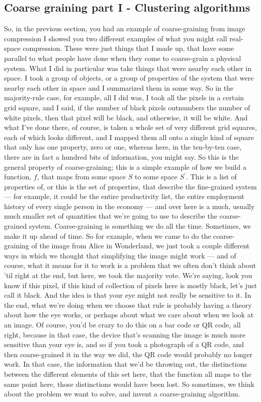 \documentclass[]{article}
\begin{document}
\subsection{Coarse graining part I - Clustering algorithms}

So, in the previous section,
you had an example of coarse-graining
from image compression
I showed you two different examples
of what you might call
real-space compression.
These were just things that
I made up,
that have some parallel
to what people have done
when they come to coarse-grain
a physical system.
What I did in particular
was take things
that were nearby each other in space.
I took a group
of objects, or a group of properties
of the system
that were nearby each other in space 
and I summarized them in some way.
So in the majority-rule case, for example,
all I did was, I took all the pixels
in a certain grid square, and I said, 
if the number of black pixels
outnumbers the number of white pixels,
then that pixel will be black,
and otherwise, it will be white.
And what I've done there, of course,
is taken a whole set of very different
grid squares, each of which
looks different,
and I mapped them all onto a single
kind of square
that only has one property, zero or one,
whereas here, in the ten-by-ten case,
there are in fact a hundred bits
of information, you might say.
So this is the general property
of coarse-graining; this is
a simple example of how we build
a function, $f$, that maps from some space $S$
to some space $S^\prime$.
This is a list of properties of, 
or this is the set of properties,
that describe the fine-grained system ---
for example, it could be the entire
productivity list,
the entire employment history
of every single person in the economy ---
and over here is a much,
usually much smaller set of quantities
that we're going to use to describe
the coarse-grained system.
Coarse-graining is something we do
all the time.
Sometimes, we make it up ahead of time.
So for example,
when we came to do the coarse-graining
of the image from Alice in Wonderland,
we just took a couple different ways
in which we thought
that simplifying the image
might work --- and of course,
what it means for it to work
is a problem that we often
don't think about 'til
right at the end, but here,
we took the majority vote.
We're saying,  look you know
if this pixel, if this kind of collection
of pixels here is mostly black,
let's just call it black.
And the idea is that your eye
might not really be
sensitive to it. In the end,
what we're doing when we choose
that rule is probably having a theory
about how the eye works,
or perhaps about what we care about
when we look at an image.
Of course, you'd be crazy to
do this on a bar code or QR code,
all right,
because in that case, the device
that's scanning the image
is much more sensitive
than your eye is,
and so if you took a photograph
of a QR code,
and then coarse-grained it
in the way we did,
the QR code would probably
no longer work.
In that case, the information that
we'd be throwing out,
the distinctions between the different
elements of this set here,
that the function all maps
to the same point here,
those distinctions would have been lost.
So sometimes,
we think about the problem we want
to solve,
and invent a coarse-graining algorithm.
\end{document}
